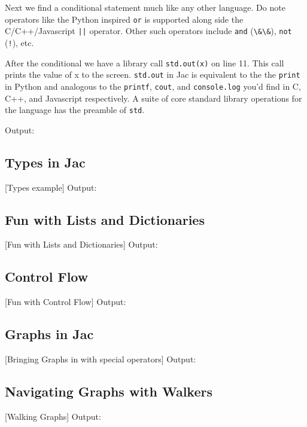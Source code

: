 \par
Next we find a conditional statement much like any other language. Do note operators like the Python inspired \lstinline{or} is supported along side the C/C++/Javascript \lstinline{||} operator. Other such operators include \lstinline{and} (\lstinline{\&\&}), \lstinline{not} (\lstinline{!}), etc.

\par
After the conditional we have a library call \lstinline{std.out(x)} on line 11. This call prints the value of x to the screen. \lstinline{std.out} in Jac is equivalent to the the \texttt{print} in Python and analogous to the \texttt{printf}, \texttt{cout}, and \texttt{console.log} you'd find in C, C++, and Javascript respectively. A suite of core standard library operations for the language has the preamble of \lstinline{std}.

Output:


\subsection{Types in Jac}
[Types example]
Output:

\subsection{Fun with Lists and Dictionaries}
[Fun with Lists and Dictionaries]
Output:

\subsection{Control Flow}
[Fun with Control Flow]
Output:

\subsection{Graphs in Jac}
[Bringing Graphs in with special operators]
Output:

\subsection{Navigating Graphs with Walkers}
[Walking Graphs]
Output:

